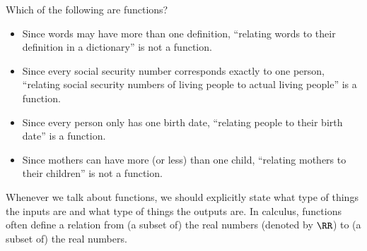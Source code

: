 \documentclass{ximera}
\begin{document}
\begin{question}
  Which of the following are functions?
  \begin{selectAll}
  \end{selectAll}
  \begin{feedback}\hfil
    \begin{itemize}
    \item Since words may have more than one definition, ``relating
      words to their definition in a dictionary'' is not a function.
    \item Since every social security number corresponds exactly to
      one person, ``relating social security numbers of living people
      to actual living people'' is a function.
    \item Since every person only has one birth date, ``relating
      people to their birth date'' is a function.
      \item Since mothers can have more (or less) than one child,
        ``relating mothers to their children'' is not a function.
    \end{itemize}
  \end{feedback}
\end{question}

Whenever we talk about functions, we should explicitly state
what type of things the inputs are and what type of things the outputs
are.  In calculus, functions often define a relation from (a subset
of) the real numbers (denoted by $\RR$) to (a subset of) the real
numbers.
\end{document}
